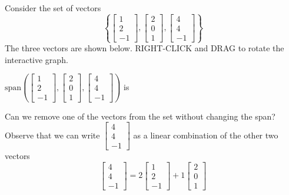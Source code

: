 \documentclass{ximera}
\begin{document}
\begin{exploration}\label{exp:redundantVecs2}
    Consider the set of vectors $$\left\{\begin{bmatrix}1\\2\\-1\end{bmatrix},\begin{bmatrix}2\\0\\1\end{bmatrix},\begin{bmatrix}4\\4\\-1\end{bmatrix}\right\}$$
The three vectors are shown below. RIGHT-CLICK and DRAG to rotate the interactive graph.


\begin{onlineOnly}
\begin{center}
\end{center}
\end{onlineOnly}

$\mbox{span}\left(\begin{bmatrix}1\\2\\-1\end{bmatrix},\begin{bmatrix}2\\0\\1\end{bmatrix},\begin{bmatrix}4\\4\\-1\end{bmatrix}\right)$ is 


Can we remove one of the vectors from the set without changing the span?  Observe that we can write $\begin{bmatrix}4\\4\\-1\end{bmatrix}$ as a linear combination of the other two vectors
 \begin{equation}\label{eq:redundant}\begin{bmatrix}4\\4\\-1\end{bmatrix}=2\begin{bmatrix}1\\2\\-1\end{bmatrix}+1\begin{bmatrix}2\\0\\1\end{bmatrix}\end{equation}


\end{exploration}
\end{document}
